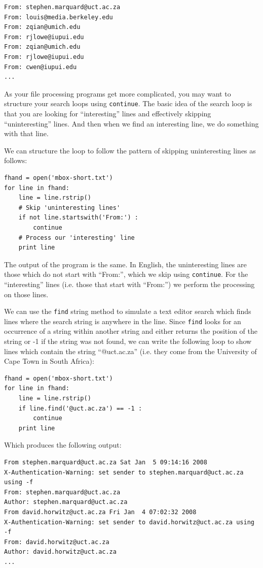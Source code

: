 \documentclass[10pt]{book}
\begin{document}
\beforeverb
\begin{verbatim}
From: stephen.marquard@uct.ac.za
From: louis@media.berkeley.edu
From: zqian@umich.edu
From: rjlowe@iupui.edu
From: zqian@umich.edu
From: rjlowe@iupui.edu
From: cwen@iupui.edu
...
\end{verbatim}
\afterverb
%
As your file processing programs get more complicated, you may want 
to structure your search loops using {\tt continue}.  The basic idea 
of the search loop is that you are looking for ``interesting'' lines
and effectively skipping ``uninteresting'' lines.  And then when we
find an interesting line, we do something with that line.

We can structure the loop to follow the
pattern of skipping uninteresting lines as follows:

\beforeverb
\begin{verbatim}
fhand = open('mbox-short.txt')
for line in fhand:
    line = line.rstrip()
    # Skip 'uninteresting lines'
    if not line.startswith('From:') :
        continue
    # Process our 'interesting' line
    print line
\end{verbatim}
\afterverb
%
The output of the program is the same.  In English, the 
uninteresting lines are those which do not start 
with ``From:'', which we skip using {\tt continue}.
For the ``interesting'' lines (i.e. those that start with ``From:'')
we perform the processing on those lines.

We can use the {\tt find} string method to simulate a text editor
search which finds lines where the search string is anywhere in the line.  
Since {\tt find} looks for an occurrence of a string within another
string and either returns the position of the string or -1 if the string
was not found, we can write the following loop to show lines which
contain the string ``@uct.ac.za'' (i.e. they come from the University 
of Cape Town in South Africa):

\beforeverb
\begin{verbatim}
fhand = open('mbox-short.txt')
for line in fhand:
    line = line.rstrip()
    if line.find('@uct.ac.za') == -1 : 
        continue
    print line
\end{verbatim}
\afterverb
%
Which produces the following output:

\beforeverb
\begin{verbatim}
From stephen.marquard@uct.ac.za Sat Jan  5 09:14:16 2008
X-Authentication-Warning: set sender to stephen.marquard@uct.ac.za using -f
From: stephen.marquard@uct.ac.za
Author: stephen.marquard@uct.ac.za
From david.horwitz@uct.ac.za Fri Jan  4 07:02:32 2008
X-Authentication-Warning: set sender to david.horwitz@uct.ac.za using -f
From: david.horwitz@uct.ac.za
Author: david.horwitz@uct.ac.za
...
\end{verbatim}
\afterverb
%
\end{document}
